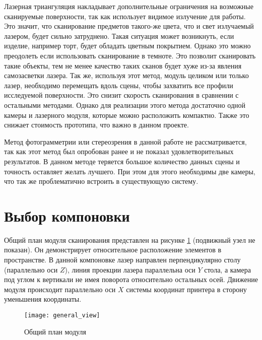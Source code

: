         Лазерная триангуляция накладывает дополнительные ограничения на возможные сканируемые поверхности, так как использует видимое излучение для работы. Это значит, что сканирование предметов такого-же цвета, что и свет излучаемый лазером, будет сильно затруднено. Такая ситуация может возникнуть, если изделие, например торт, будет обладать цветным покрытием. Однако это можно преодолеть если использовать сканирование в темноте. Это позволит сканировать такие объекты, тем не менее качество таких сканов будет хуже из-за явления самозасветки лазера.
        Так же, используя этот метод, модуль целиком или только лазер, необходимо перемещать вдоль сцены, чтобы захватить все профили исследуемой поверхности. Это снизит скорость сканирования в сравнении с остальными методами.
        Однако для реализации этого метода достаточно одной камеры и лазерного модуля, которые можно расположить компактно. Также это снижает стоимость прототипа, что важно в данном проекте.

        Метод фотограмметрии или стереозрения в данной работе не рассматривается, так как этот метод был опробован ранее и не показал удовлетворительных результатов. В данном методе теряется большое количество данных сцены и точность оставляет желать лучшего. При этом для этого необходимы две камеры, что так же проблематично встроить в существующую систему\cite{SkripkoPASEKA}.
        
    \section{Выбор компоновки}
        Общий план модуля сканирования представлен на рисунке \ref{pic:general_view} (подвижный узел не показан). Он демонстрирует относительное расположение элементов в пространстве. В данной компоновке лазер направлен перпендикулярно столу (параллельно оси $ Z $), линия проекции лазера параллельна оси $ Y $ стола, а камера под углом к вертикали не имея поворота относительно остальных осей. Движение модуля происходит параллельно оси $ X $ системы координат принтера в сторону уменьшения координаты.

        

        \begin{figure}[H]
            \centering
            \texttt{[image: general\_view]}
            \caption{Общий план модуля}
            \label{pic:general_view}
        \end{figure}

